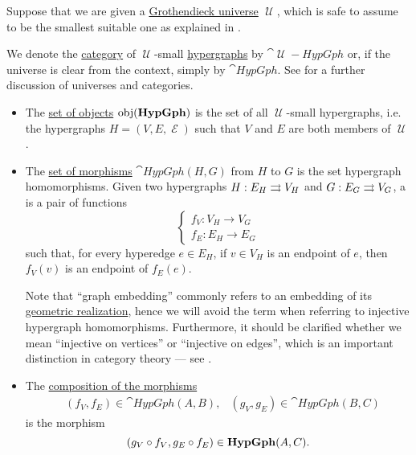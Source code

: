 \begin{definition}\label{def:category_of_small_hypergraphs}
  Suppose that we are given a \hyperref[def:grothendieck_universe]{Grothendieck universe} \( \mscrU \), which is safe to assume to be the smallest suitable one as explained in .

  We denote the \hyperref[def:category]{category} of \( \mscrU \)-small \hyperref[def:hypergraph]{hypergraphs} by \( \cat{\mscrU-HypGph} \) or, if the universe is clear from the context, simply by \( \cat{HypGph} \). See  for a further discussion of universes and categories.

  \begin{itemize}
    \item The \hyperref[def:category/objects]{set of objects} \( \operatorname{obj}(\operatorname{\mathbf{HypGph}}) \) is the set of all \( \mscrU \)-small hypergraphs, i.e. the hypergraphs \( H = (V, E, \mscrE) \) such that \( V \) and \( E \) are both members of \( \mscrU \).

    \item The \hyperref[def:category/morphisms]{set of morphisms} \( \cat{HypGph}(H, G) \) from \( H \) to \( G \) is the set hypergraph homomorphisms. Given two hypergraphs \( H: E_H \rightrightarrows V_H \) and \( G: E_G \rightrightarrows V_G \), a  is a pair of functions
    \begin{equation}\label{eq:def:category_of_small_hypergraphs/homomorphism}
      \begin{cases}
        f_V: V_H \to V_G \\
        f_E: E_H \to E_G
      \end{cases}
    \end{equation}
    such that, for every hyperedge \( e \in E_H \), if \( v \in V_H \) is an endpoint of \( e \), then \( f_V(v) \) is an endpoint of \( f_E(e) \).

    Note that \enquote{graph embedding} commonly refers to an embedding of its \hyperref[def:quiver_geometric_realization/undirected]{geometric realization}, hence we will avoid the term when referring to injective hypergraph homomorphisms. Furthermore, it should be clarified whether we mean \enquote{injective on vertices} or \enquote{injective on edges}, which is an important distinction in category theory --- see .

    \item The \hyperref[def:category/composition]{composition of the morphisms}
    \begin{align*}
      &(f_V, f_E) \in \cat{HypGph}(A, B),
      &(g_V, g_E) \in \cat{HypGph}(B, C)
    \end{align*}
    is the morphism
    \begin{equation*}
      (g_V \mathbin \circ f_V, g_E \mathbin \circ f_E) \in \operatorname{\mathbf{HypGph}}(A, C).
    \end{equation*}


\end{itemize}
\end{definition}
